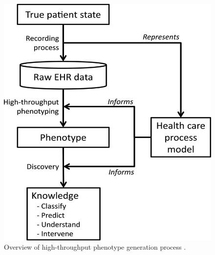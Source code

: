 \documentclass{sig-alternate-05-2015}
\begin{document}
\begin{figure} [t]
\centering
\includegraphics[width=0.75\linewidth]{example-phenotype-process.jpg}
\caption{Overview of high-throughput phenotype generation process \cite{hripcsak2013next}.}
\label{fig:decomp-example}
\end{figure}

\end{document}
